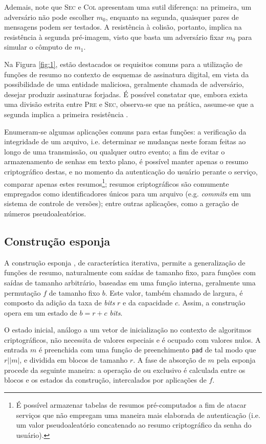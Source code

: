 \documentclass[12pt]{report}
\newcommand{\length}[1]{\vert #1 \vert}
\begin{document}
Ademais, note que \textsc{Sec} e \textsc{Col} apresentam uma sutil diferença:
na primeira, um adversário não pode escolher $m_0$, enquanto na segunda,
quaisquer pares de mensagens podem ser testados. A resistência à colisão,
portanto, implica na resistência à segunda pré-imagem, visto que basta um
adversário fixar $m_0$ para simular o cômputo de $m_1$.

Na Figura \ref{fig:1}, estão destacados os requisitos comuns para a utilização
de funções de resumo no contexto de esquemas de assinatura digital, em vista da
possibilidade de uma entidade maliciosa, geralmente chamada de adversário,
desejar produzir assinaturas forjadas. É possível constatar que, embora exista
uma divisão estrita entre \textsc{Pre} e \textsc{Sec}, observa-se que na
prática, assume-se que a segunda implica a primeira resistência
\cite[9.20]{Menezes:1996:HAC:548089}.

Enumeram-se algumas aplicações comuns para estas funções: a verificação da
integridade de um arquivo, i.e. determinar se mudanças neste foram feitas ao
longo de uma transmissão, ou qualquer outro evento; a fim de evitar o
armazenamento de senhas em texto plano, é possível manter apenas o resumo
criptográfico destas, e no momento da autenticação do usuário perante o
serviço, comparar apenas estes resumos\footnote{É possível armazenar tabelas de
resumos pré-computados a fim de atacar serviços que não empregam uma maneira
mais elaborada de autenticação (i.e. um valor pseudoaleatório concatenado ao
resumo criptográfico da senha do usuário).}; resumos criptográficos são
comumente empregados como identificadores únicos para um arquivo (e.g.
\emph{commits} em um sistema de controle de versões); entre outras aplicações,
como a geração de números pseudoaleatórios.

\subsection{Construção esponja}

A construção esponja \cite{SpongeReference}, de característica iterativa,
permite a generalização de funções de resumo, naturalmente com saídas de
tamanho fixo, para funções com saídas de tamanho arbitrário, baseadas em uma
função interna, geralmente uma permutação $f$ de tamanho fixo $b$. Este valor,
também chamado de largura, é composto da adição da taxa de \emph{bits} $r$ e da
capacidade $c$. Assim, a construção opera em um estado de $b = r + c$
\emph{bits}.

O estado inicial, análogo a um vetor de inicialização no contexto de algoritmos
criptográficos, não necessita de valores especiais e é ocupado com valores
nulos. A entrada $m$ é preenchida com uma função de preenchimento \texttt{pad}
de tal modo que $r \mid \length{m}$, e dividida em blocos de tamanho $r$. A
fase de absorção de $m$ pela esponja procede da seguinte maneira: a operação de
ou exclusivo é calculada entre os blocos e os estados da construção,
intercalados por aplicações de $f$.
\end{document}
